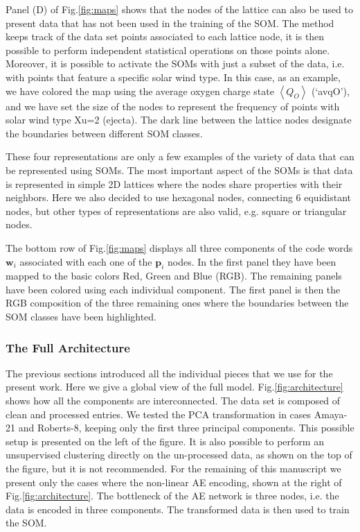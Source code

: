 \documentclass[utf8]{frontiersSCNS} %
\begin{document}
Panel (D) of Fig.\ref{fig:maps} shows that the nodes of the lattice can also be used to present data that has not been used in the training of the SOM. The method keeps track of the data set points associated to each lattice node, it is then possible to perform independent statistical operations on those points alone. Moreover, it is possible to activate the SOMs with just a subset of the data, i.e. with points that feature a specific solar wind type. In this case, as an example, we have colored the map using the average oxygen charge state $\left<Q_{O}\right>$ (`avqO'), and we have set the size of the nodes to represent the frequency of points with solar wind type Xu=2 (ejecta). The dark line between the lattice nodes designate the boundaries between different SOM classes.

These four representations are only a few examples of the variety of data that can be represented using SOMs. The most important aspect of the SOMs is that data is represented in simple 2D lattices where the nodes share properties with their neighbors. Here we also decided to use hexagonal nodes, connecting 6 equidistant nodes, but other types of representations are also valid, e.g. square or triangular nodes.

The bottom row of Fig.\ref{fig:maps} displays all three components of the code words $\boldsymbol{w}_i$ associated with each one of the $\boldsymbol{p}_i$ nodes. In the first panel they have been mapped to the basic colors Red, Green and Blue (RGB). The remaining panels have been colored using each individual component. The first panel is then the RGB composition of the three remaining ones where the boundaries between the SOM classes have been highlighted.

\subsubsection{The Full Architecture}
\label{sec:fullarchi}
The previous sections introduced all the individual pieces that we use for the present work. Here we give a global view of the full model. Fig.\ref{fig:architecture} shows how all the components are interconnected. The data set is composed of clean and processed entries. We tested the PCA transformation in cases Amaya-21 and Roberts-8, keeping only the first three principal components. This possible setup is presented on the left of the figure. It is also possible to perform an unsupervised clustering directly on the un-processed data, as shown on the top of the figure, but it is not recommended. For the remaining of this manuscript we present only the cases where the non-linear AE encoding, shown at the right of Fig.\ref{fig:architecture}. The bottleneck of the AE network is three nodes, i.e. the data is encoded in three components. The transformed data is then used to train the SOM.
\end{document}
